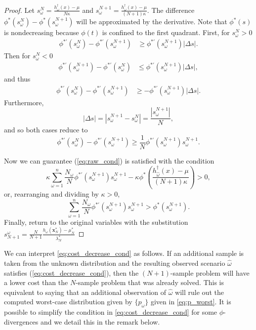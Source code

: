 \documentclass[ijoc,letterpaper]{informs3} %
\newcommand{\x}{\mathbf{x}}
\begin{document}
\begin{proof}
	Let $s^N_\omega = \frac{h^\dagger_\omega(x) - \mu}{N\kappa}$ and $s^{N+1}_\omega = \frac{h^\dagger_\omega(x) - \mu}{(N+1)\kappa}$.
	The difference $\phi^*(s^N_\omega) - \phi^*(s^{N+1}_\omega)$ will be approximated by the derivative.
	Note that $\phi^*(s)$ is nondecreasing because $\phi(t)$ is confined to the first quadrant.
	First, for $s^N_\omega > 0$
	\begin{align*}
		\phi^{*\prime}(s^N_\omega) - \phi^{*\prime}(s^{N+1}_\omega) & \geq \phi^{*\prime}(s^{N+1}_\omega) |\Delta s|.
	\end{align*}
	Then for $s^N_\omega < 0$
	\begin{align*}
		\phi^{*\prime}(s^{N+1}_\omega) - \phi^{*\prime}(s^N_\omega) & \leq \phi^{*\prime}(s^{N+1}_\omega) |\Delta s|,
	\end{align*}
	and thus
	\begin{align*}
		\phi^{*\prime}(s^N_\omega) - \phi^{*\prime}(s^{N+1}_\omega) & \geq -\phi^{*\prime}(s^{N+1}_\omega) |\Delta s|.
	\end{align*}
	Furthermore, 
	\[
		|\Delta s| = | s^{N+1}_\omega - s^N_\omega | = \frac{|s^{N+1}_\omega|}{N},
	\]
	and so both cases reduce to
	\[
		\phi^{*\prime}(s^N_\omega) - \phi^{*\prime}(s^{N+1}_\omega) \geq \frac{1}{N} \phi^{*\prime}(s^{N+1}_\omega) s^{N+1}_\omega.
	\]

	Now we can guarantee (\ref{eq:raw_cond}) is satisfied with the condition
	\[
		\kappa \sum_{\omega=1}^n \frac{N_\omega}{N} \phi^{*\prime}(s^{N+1}_\omega) s^{N+1}_\omega - \kappa \phi^*\left(\frac{h^\dagger_{\hat{\omega}}(x) - \mu}{(N+1)\kappa}\right) > 0,
	\]
	or, rearranging and dividing by $\kappa > 0$,
	\begin{equation} \label{eq:main_value_derivation}
		\sum_{\omega=1}^n \frac{N_\omega}{N} \phi^{*\prime}(s^{N+1}_\omega) s^{N+1}_\omega > \phi^*(s^{N+1}_\omega).
	\end{equation}
	Finally, return to the original variables with the substitution $s^\omega_{N+1} = \frac{N}{N+1} \frac{h_\omega(\x^*_N) - \mu^*_N}{\lambda^*_N}$
\end{proof}


We can interpret \eqref{eq:cost_decrease_cond} as follows. If an additional sample is taken from the unknown distribution and the resulting observed scenario $\hat{\omega}$ satisfies (\ref{eq:cost_decrease_cond}), then the $(N+1)$-sample problem will have a lower cost than the $N$-sample problem that was already solved.
This is equivalent to saying that an additional observation of $\hat{\omega}$ will rule out the computed worst-case distribution given by $\{p_\omega\}$ given in \eqref{eq:p_worst}.
It is possible to simplify the condition in \eqref{eq:cost_decrease_cond} for some $\phi$-divergences and we detail this in the remark below. 
\end{document}
